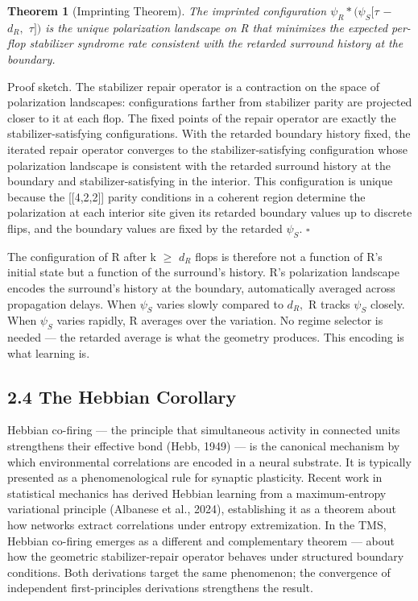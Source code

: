 \documentclass[11pt,oneside]{report}
\newtheorem{theorem}{Theorem}[section]
\theoremstyle{definition}
\theoremstyle{remark}
\begin{document}
\begin{theorem}[Imprinting Theorem]
The imprinted configuration
\ensuremath{\psi_{R}*(\psi_{S}}\textbar\ensuremath{[\tau} \ensuremath{-} \ensuremath{d_{R},} \ensuremath{\tau ])} is the unique polarization
landscape on R that minimizes the expected per-flop stabilizer syndrome
rate consistent with the retarded surround history at the boundary.
\end{theorem}

Proof sketch. The stabilizer repair operator is a contraction on the
space of polarization landscapes: configurations farther from stabilizer
parity are projected closer to it at each flop. The fixed points of the
repair operator are exactly the stabilizer-satisfying configurations.
With the retarded boundary history fixed, the iterated repair operator
converges to the stabilizer-satisfying configuration whose polarization
landscape is consistent with the retarded surround history at the
boundary and stabilizer-satisfying in the interior. This configuration
is unique because the [[4,2,2]] parity conditions in a coherent
region determine the polarization at each interior site given its
retarded boundary values up to discrete flips, and the boundary values
are fixed by the retarded \ensuremath{\psi_{S}.} \hfill\ensuremath{\square}

The configuration of R after k \ensuremath{\geq} \ensuremath{d_{R}} flops is therefore not a function
of R's initial state but a function of the surround's history. R's
polarization landscape encodes the surround's history at the boundary,
automatically averaged across propagation delays. When \ensuremath{\psi_{S}} varies
slowly compared to \ensuremath{d_{R},} R tracks \ensuremath{\psi_{S}} closely. When \ensuremath{\psi_{S}} varies
rapidly, R averages over the variation. No regime selector is needed ---
the retarded average is what the geometry produces. This encoding is
what learning is.

\subsection*{2.4 The Hebbian Corollary}

Hebbian co-firing --- the principle that simultaneous activity in
connected units strengthens their effective bond (Hebb, 1949) --- is the
canonical mechanism by which environmental correlations are encoded in a
neural substrate. It is typically presented as a phenomenological rule
for synaptic plasticity. Recent work in statistical mechanics has
derived Hebbian learning from a maximum-entropy variational principle
(Albanese et al., 2024), establishing it as a theorem about how networks
extract correlations under entropy extremization. In the TMS, Hebbian
co-firing emerges as a different and complementary theorem --- about how
the geometric stabilizer-repair operator behaves under structured
boundary conditions. Both derivations target the same phenomenon; the
convergence of independent first-principles derivations strengthens the
result.
\end{document}

